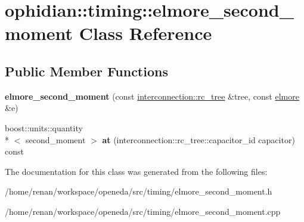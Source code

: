 \hypertarget{classophidian_1_1timing_1_1elmore__second__moment}{\section{ophidian\-:\-:timing\-:\-:elmore\-\_\-second\-\_\-moment Class Reference}
\label{classophidian_1_1timing_1_1elmore__second__moment}
}
\subsection*{Public Member Functions}
\begin{DoxyCompactItemize}
\item 
\hypertarget{classophidian_1_1timing_1_1elmore__second__moment_aef9b6f06c6bc25c6d6849a5adbf3814f}{{\bfseries elmore\-\_\-second\-\_\-moment} (const \hyperlink{classophidian_1_1interconnection_1_1rc__tree}{interconnection\-::rc\-\_\-tree} \&tree, const \hyperlink{classophidian_1_1timing_1_1elmore}{elmore} \&e)}\label{classophidian_1_1timing_1_1elmore__second__moment_aef9b6f06c6bc25c6d6849a5adbf3814f}

\item 
\hypertarget{classophidian_1_1timing_1_1elmore__second__moment_a5a6f1e71836dde5f1be8f9d2102fdfcf}{boost\-::units\-::quantity\\*
$<$ second\-\_\-moment $>$ {\bfseries at} (interconnection\-::rc\-\_\-tree\-::capacitor\-\_\-id capacitor) const }\label{classophidian_1_1timing_1_1elmore__second__moment_a5a6f1e71836dde5f1be8f9d2102fdfcf}

\end{DoxyCompactItemize}


The documentation for this class was generated from the following files\-:\begin{DoxyCompactItemize}
\item 
/home/renan/workspace/openeda/src/timing/elmore\-\_\-second\-\_\-moment.\-h\item 
/home/renan/workspace/openeda/src/timing/elmore\-\_\-second\-\_\-moment.\-cpp\end{DoxyCompactItemize}

